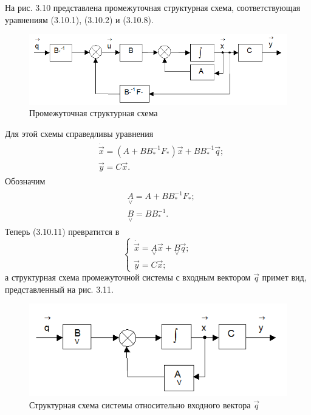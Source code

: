 На рис. 3.10 представлена промежуточная структурная схема, соответствующая уравнениям (3.10.1), (3.10.2) и (3.10.8).
\begin{figure}[H]
	\centering
	\includegraphics[scale=0.9]{images/Fig3_10}
	\caption{Промежуточная структурная схема}
\end{figure}
Для этой схемы справедливы уравнения
\begin{gather}
\begin{split}
	&\dot{\vec{x}}=(A+BB_*^{-1}F_*)\vec{x}+BB_*^{-1}\vec{q};\\
	&\vec{y}=C\vec{x}.
\end{split}
\end{gather}
Обозначим
\begin{gather}
\begin{split}
	&\underset{\lor}{A}=A+BB_*^{-1}F_*;\\
	&\underset{\lor}{B}=BB_*^{-1}.
\end{split}
\end{gather}
Теперь (3.10.11) превратится в 
\begin{equation}
\begin{cases}
	\dot{\vec{x}}=\underset{\lor}{A}\vec{x}+\underset{\lor}{B}\vec{q};\\
	\vec{y}=C\vec{x};
\end{cases}
\end{equation}
а структурная схема промежуточной системы с входным вектором $\vec{q}$ примет вид, представленный на рис. 3.11.
\begin{figure}[H]
	\centering
	\includegraphics[scale=0.9]{images/Fig3_11}
	\caption{Структурная схема системы относительно входного вектора $\vec{q}$}
\end{figure}

